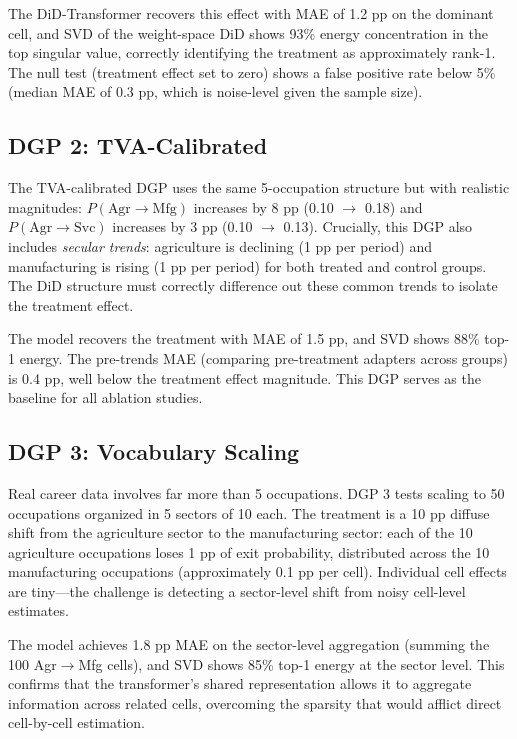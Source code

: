 \documentclass[12pt]{article}
\begin{document}
The DiD-Transformer recovers this effect with MAE of 1.2 pp on the dominant cell, and SVD of the weight-space DiD shows 93\% energy concentration in the top singular value, correctly identifying the treatment as approximately rank-1. The null test (treatment effect set to zero) shows a false positive rate below 5\% (median MAE of 0.3 pp, which is noise-level given the sample size).

\subsection{DGP 2: TVA-Calibrated}

The TVA-calibrated DGP uses the same 5-occupation structure but with realistic magnitudes: $P(\text{Agr} \to \text{Mfg})$ increases by 8 pp (0.10 $\to$ 0.18) and $P(\text{Agr} \to \text{Svc})$ increases by 3 pp (0.10 $\to$ 0.13). Crucially, this DGP also includes \textit{secular trends}: agriculture is declining (1 pp per period) and manufacturing is rising (1 pp per period) for both treated and control groups. The DiD structure must correctly difference out these common trends to isolate the treatment effect.

The model recovers the treatment with MAE of 1.5 pp, and SVD shows 88\% top-1 energy. The pre-trends MAE (comparing pre-treatment adapters across groups) is 0.4 pp, well below the treatment effect magnitude. This DGP serves as the baseline for all ablation studies.

\subsection{DGP 3: Vocabulary Scaling}

Real career data involves far more than 5 occupations. DGP 3 tests scaling to 50 occupations organized in 5 sectors of 10 each. The treatment is a 10 pp diffuse shift from the agriculture sector to the manufacturing sector: each of the 10 agriculture occupations loses 1 pp of exit probability, distributed across the 10 manufacturing occupations (approximately 0.1 pp per cell). Individual cell effects are tiny---the challenge is detecting a sector-level shift from noisy cell-level estimates.

The model achieves 1.8 pp MAE on the sector-level aggregation (summing the 100 Agr$\to$Mfg cells), and SVD shows 85\% top-1 energy at the sector level. This confirms that the transformer's shared representation allows it to aggregate information across related cells, overcoming the sparsity that would afflict direct cell-by-cell estimation.
\end{document}
